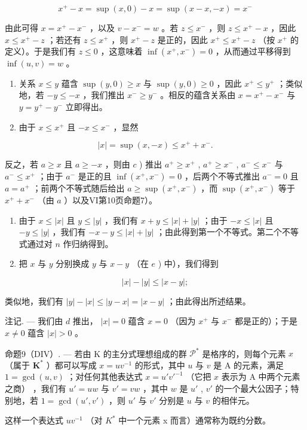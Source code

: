 \[
x ^ {+} - x = \sup (x, 0) - x = \sup (x - x, - x) = x ^ {-}
\]

由此可得 \(x = x^{+} - x^{-}\) ，以及 \(v - x^{-} = w\) 。若 \(z \leqslant x^{-}\) ，则 \(z \leqslant x^{+} - x\) ，因此 \(x \leqslant x^{+} - z\) ；若还有 \(z \leqslant x^{+}\) ，则 \(x^{+} - z\) 是正的，因此 \(x^{+} \leqslant x^{+} - z\) （按 \(x^{+}\) 的定义）。于是我们有 \(z \leqslant 0\) ，这意味着 \(\inf(x^{+}, x^{-}) = 0\) ，从而通过平移得到 \(\inf(u, v) = w\) 。

\begin{enumerate}
\def\labelenumi{\alph{enumi})}
\setcounter{enumi}{2}
\item
  关系 \(x \leqslant y\) 蕴含 \(\sup (y, 0) \geqslant x\) 与 \(\sup (y, 0) \geqslant 0\) ，因此 \(x^{+} \leqslant y^{+}\) ；类似地，若 \(-y \leqslant -x\) ，我们推出 \(x^{-} \geqslant y^{-}\) 。相反的蕴含关系由 \(x = x^{+} - x^{-}\) 与 \(y = y^{+} - y^{-}\) 立即得出。
\item
  由于 \(x \leqslant x^{+}\) 且 \(-x \leqslant x^{-}\) ，显然
\end{enumerate}

\[
\left| x \right| = \sup (x, - x) \leqslant x ^ {+} + x ^ {-}.
\]

反之，若 \(a \geqslant x\) 且 \(a \geqslant -x\) ，则由 \(c\) ) 推出 \(a^+ \geqslant x^+\) , \(a^+ \geqslant x^-\) , \(a^- \leqslant x^-\) 与 \(a^- \leqslant x^+\) ；由于 \(a^-\) 是正的且 \(\inf(x^+, x^-) = 0\) ，后两个不等式推出 \(a^- = 0\) 且 \(a = a^+\) ；前两个不等式随后给出 \(a \geqslant \sup(x^+, x^-)\) ，而 \(\sup(x^+, x^-)\) 等于 \(x^+ + x^-\) （由 \(a\) ）以及VI第10页命题7）。

\begin{enumerate}
\def\labelenumi{\alph{enumi})}
\setcounter{enumi}{4}
\item
  由于 \(x \leqslant |x|\) 且 \(y \leqslant |y|\) ，我们有 \(x + y \leqslant |x| + |y|\) ；由于 \(-x \leqslant |x|\) 且 \(-y \leqslant |y|\) ，我们有 \(-x - y \leqslant |x| + |y|\) ；由此得到第一个不等式。第二个不等式通过对 \(n\) 作归纳得到。
\item
  把 \(x\) 与 \(y\) 分别换成 \(y\) 与 \(x - y\) （在 \(e\) ) 中），我们得到
\end{enumerate}

\[
\left| x \right| - \left| y \right| \leqslant \left| x - y \right|;
\]

类似地，我们有 \(|y| - |x| \leqslant |y - x| = |x - y|\) ；由此得出所述结果。

注记. --- 我们由 \(d\) 推出， \(|x|=0\) 蕴含 \(x=0\) （因为 \(x^{+}\) 与 \(x^{-}\) 都是正的）；于是 \(x\neq0\) 蕴含 \(|x|>0\) 。

命题9（DIV）. --- 若由 K 的主分式理想组成的群 \(\mathcal{P}^*\) 是格序的，则每个元素 \(x\) （属于 \(\mathbf{K}^*\) ）都可以写成 \(x = uv^{-1}\) 的形式，其中 \(u\) 与 \(v\) 是 A 的元素，满足 \(1 = \gcd(u, v)\) ；对任何其他表达式 \(x = u'v'^{-1}\) （它把 \(x\) 表示为 A 中两个元素之商） ，我们有 \(u' = uw\) 与 \(v' = vw\) ，其中 \(w\) 是 \(u'\) , \(v'\) 的一个最大公因子；特别地，若 \(1 = \gcd(u', v')\) ，则 \(u'\) 与 \(v'\) 分别是 \(u\) 与 \(v\) 的相伴元。

这样一个表达式 \(uv^{-1}\) （对 \(K^{*}\) 中一个元素 x 而言）通常称为既约分数。

